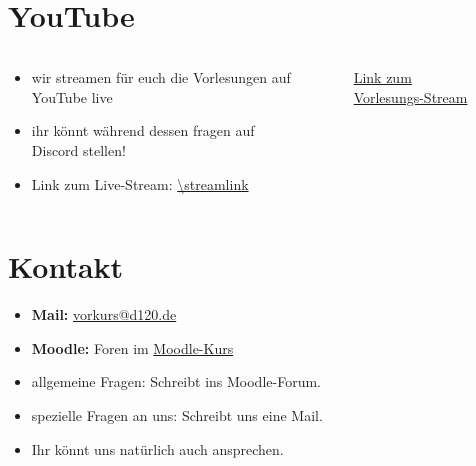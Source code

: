 \section{YouTube}
\begin{frame}[c]
    \slidehead
    \begin{columns}[c]
        \begin{column}{.5\textwidth}
            \begin{itemize}
                \item wir streamen für euch die Vorlesungen auf YouTube live
                \item ihr könnt während dessen fragen auf Discord stellen!
                \item Link zum Live-Stream: \url{\streamlink}
            \end{itemize}
        \end{column}%
        \begin{column}{.5\textwidth}
            \begin{figure}
                \centering\mbox{}
                \qrcode[height=3cm]{\streamlink}
                \caption{\href{\streamlink}{Link zum Vorlesungs-Stream}}
            \end{figure}
        \end{column}
    \end{columns}
\end{frame}


\section{Kontakt}
\begin{frame}
    \slidehead
    \begin{itemize}
        \item \textbf{Mail:} \href{mailto:vorkurs@d120.de}{vorkurs@d120.de}
        \item \textbf{Moodle:}  Foren im \href{\moodlecourselink}{Moodle-Kurs}
    \end{itemize}
    \vspace{1cm}
    \begin{defBox}[title=Hinweise]%
        \begin{itemize}
            \item allgemeine Fragen: Schreibt ins Moodle-Forum.
            \item spezielle Fragen an uns: Schreibt uns eine Mail.
            \item Ihr könnt uns natürlich auch ansprechen.
        \end{itemize}
    \end{defBox}
\end{frame}

